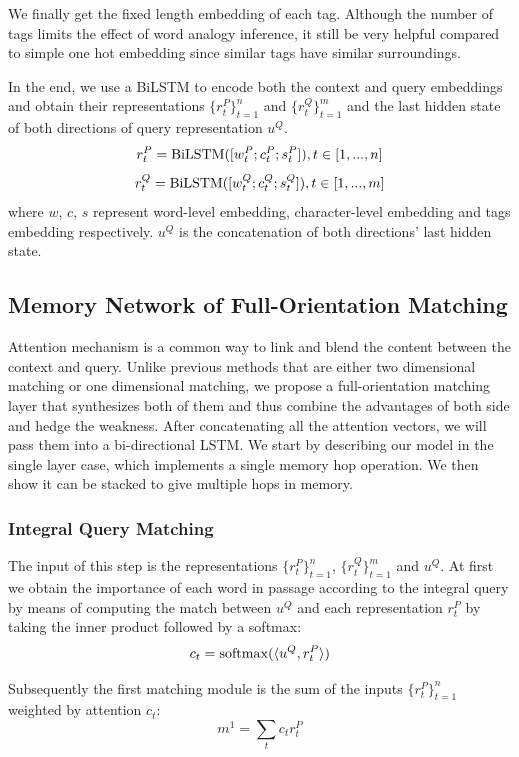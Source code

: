 \documentclass[letterpaper]{article}
\begin{document}
We finally get the fixed length embedding of each tag. Although the number of tags limits the effect of word analogy inference, it still be very helpful compared to simple one hot embedding since similar tags have similar surroundings.

In the end, we use a BiLSTM to encode both the context and query embeddings and obtain their representations $\{ r^{P}_{t} \}^{n}_{t=1}$ and $\{ r^{Q}_{t} \}^{m}_{t=1}$ and the last hidden state of both directions of query representation $u^{Q}$.
 $$r^{P}_{t} = {\rm BiLSTM}([w^{P}_{t}; c^{P}_{t}; s^{P}_{t}]), t \in [1,...,n]$$
 $$r^{Q}_{t} = {\rm BiLSTM}([w^{Q}_{t}; c^{Q}_{t}; s^{Q}_{t}]), t \in [1,...,m]$$
where $w$, $c$, $s$ represent word-level embedding, character-level embedding and tags embedding respectively. $u^{Q}$ is the concatenation of both directions' last hidden state.

\subsection{Memory Network of Full-Orientation Matching}
Attention mechanism is a common way to link and blend the content between the context and query. Unlike previous methods that are either two dimensional matching or one dimensional matching, we propose a full-orientation matching layer that synthesizes both of them and thus combine the advantages of both side and hedge the weakness. After concatenating all the attention vectors, we will pass them into a bi-directional LSTM. We start by describing our model in the single layer case, which implements a single memory hop operation. We then show it can be stacked to give multiple hops in memory. \\

\subsubsection{Integral Query Matching}
The input of this step is the representations $\{ r^{P}_{t} \}^{n}_{t=1}$, $\{ r^{Q}_{t} \}^{m}_{t=1}$ and $u^{Q}$. At first we obtain the importance of each word in passage according to the integral query by means of computing the match between $u^{Q}$ and each representation  $ r^{P}_{t}$  by taking the inner product followed by a softmax:
$$c_t = {\rm softmax} (\langle u^{Q}, r^{P}_{t} \rangle)$$

Subsequently the first matching module is the sum of the inputs $\{ r^{P}_{t} \}^{n}_{t=1}$ weighted by attention $c_t$:
$$m^{1} = \sum_t c_t r^{P}_{t}$$
\end{document}
